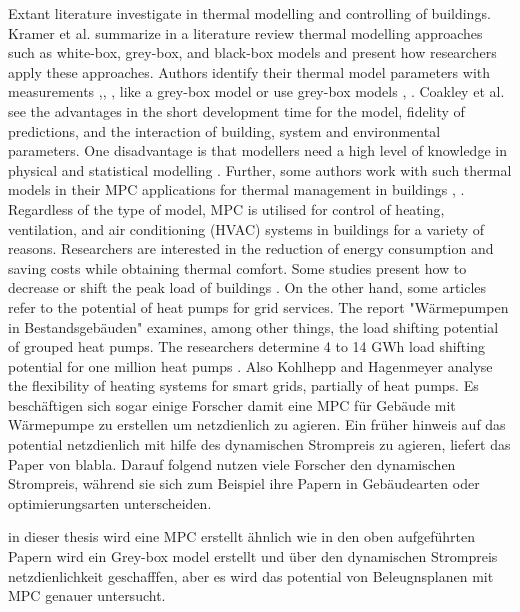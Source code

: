     Extant literature investigate in thermal modelling and controlling of buildings. Kramer et al. \cite{Kramer.2012} summarize in a literature review thermal modelling approaches such as white-box, grey-box, and black-box models and present how researchers apply these approaches. Authors identify their thermal model parameters with measurements \cite{Siroky.2011},\cite{Hazyuk.2012}, \cite{Park.2011}, like a grey-box model or use grey-box models \cite{Freund.2020}, \cite{EvelynSperber.2019}. Coakley et al. \cite{Coakley.2014} see the advantages in the short development time for the model, fidelity of predictions, and the interaction of building, system and environmental parameters. One disadvantage is that modellers need a high level of knowledge in physical and statistical modelling \cite{Coakley.2014}.
    \newline
    Further, some authors work with such thermal models in their MPC applications for thermal management in buildings \cite{JiriCigler.}, \cite{Hazyuk.2012b}. 
    \newline
    Regardless of the type of model, MPC is utilised for control of heating, ventilation, and air conditioning (HVAC) systems in buildings for a variety of reasons. Researchers are interested in the reduction of energy consumption \cite{Hazyuk.2012b} and saving costs \cite{Zwickel.2019} while obtaining thermal comfort. Some studies present how to decrease or shift the peak load of buildings \cite{Oldewurtel.2010}.
    \newline
    On the other hand, some articles refer to the potential of heat pumps for grid services.
    The report "Wärmepumpen in Bestandsgebäuden" examines, among other things, the load shifting potential of grouped heat pumps. The researchers determine 4 to 14 GWh load shifting potential for one million heat pumps \cite{WPimBestand.2020}.
    Also Kohlhepp and Hagenmeyer \cite{Kohlhepp.2017} analyse the flexibility of heating systems for smart grids, partially of heat pumps. 
    \newline
     Es beschäftigen sich sogar einige Forscher damit eine MPC für Gebäude mit Wärmepumpe zu erstellen um netzdienlich zu agieren. Ein früher hinweis auf das potential netzdienlich mit hilfe des dynamischen Strompreis zu agieren, liefert das Paper von blabla. Darauf folgend nutzen viele Forscher den dynamischen Strompreis, während sie sich zum Beispiel ihre Papern in Gebäudearten oder optimierungsarten unterscheiden. 
     
     in dieser thesis wird eine MPC erstellt ähnlich wie in den oben aufgeführten Papern wird ein Grey-box model erstellt und über den dynamischen Strompreis netzdienlichkeit geschafffen, aber es wird das potential von Beleugnsplanen mit MPC genauer untersucht.
     
